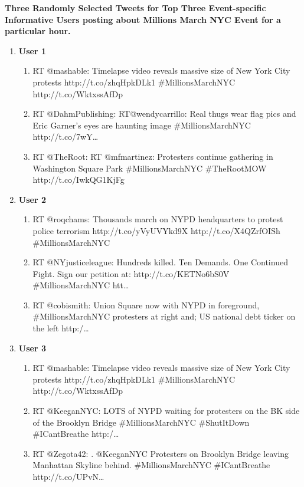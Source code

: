 \textbf{Three Randomly Selected Tweets for Top Three Event-specific Informative Users posting about Millions March NYC Event for a particular hour.}
\begin{enumerate}
\item \textbf{User 1}
\begin{enumerate}
\item RT @mashable: Timelapse video reveals massive size of New York City protests http://t.co/zhqHpkDLk1 \#MillionsMarchNYC http://t.co/WktxssAfDp
\item RT @DahmPublishing: RT@wendycarrillo: Real thugs wear flag pics and Eric Garner's eyes are haunting image \#MillionsMarchNYC http://t.co/7wY…
\item RT @TheRoot: RT @mfmartinez: Protesters continue gathering in Washington Square Park \#MillionsMarchNYC \#TheRootMOW http://t.co/IwkQG1KjFg
\end{enumerate}

\item \textbf{User 2}
\begin{enumerate}
\item RT @roqchams: Thousands march on NYPD headquarters to protest police terrorism http://t.co/yVyUVYkd9X http://t.co/X4QZrfOISh \#MillionsMarchNYC
\item RT @NYjusticeleague: Hundreds killed. Ten Demands. One Continued Fight.  Sign our petition at: http://t.co/KETNo6bS0V \#MillionsMarchNYC htt…
\item RT @cobismith: Union Square now with NYPD in foreground, \#MillionsMarchNYC protesters at right and; US national debt ticker on the left http:/…
\end{enumerate}

\item \textbf{User 3}
\begin{enumerate}
\item RT @mashable: Timelapse video reveals massive size of New York City protests http://t.co/zhqHpkDLk1 \#MillionsMarchNYC http://t.co/WktxssAfDp
\item RT @KeeganNYC: LOTS of NYPD waiting for protesters on the BK side of the Brooklyn Bridge \#MillionsMarchNYC \#ShutItDown \#ICantBreathe http:/…
\item RT @Zegota42: . @KeeganNYC Protesters on Brooklyn Bridge leaving Manhattan Skyline behind. \#MillionsMarchNYC \#ICantBreathe http://t.co/UPvN…
\end{enumerate}

\end{enumerate}


